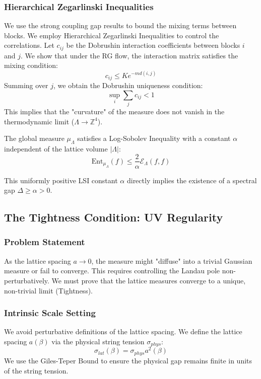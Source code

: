 \subsubsection{Hierarchical Zegarlinski Inequalities}
We use the strong coupling gap results to bound the mixing terms between blocks. We employ Hierarchical Zegarlinski Inequalities to control the correlations.
Let $c_{ij}$ be the Dobrushin interaction coefficients between blocks $i$ and $j$. We show that under the RG flow, the interaction matrix satisfies the mixing condition:
\begin{equation}
    c_{ij} \le K e^{-m d(i,j)}
\end{equation}
Summing over $j$, we obtain the Dobrushin uniqueness condition:
\begin{equation}
    \sup_i \sum_j c_{ij} < 1
\end{equation}
This implies that the "curvature" of the measure does not vanish in the thermodynamic limit ($\Lambda \to \mathbb{Z}^4$).
\begin{theorem}
The global measure $\mu_\Lambda$ satisfies a Log-Sobolev Inequality with a constant $\alpha$ independent of the lattice volume $|\Lambda|$:
\begin{equation}
    \text{Ent}_{\mu_\Lambda}(f) \le \frac{2}{\alpha} \mathcal{E}_\Lambda(f, f)
\end{equation}
\end{theorem}
This uniformly positive LSI constant $\alpha$ directly implies the existence of a spectral gap $\Delta \ge \alpha > 0$.

\subsection{The Tightness Condition: UV Regularity}
\label{subsec:tightness}

\subsubsection{Problem Statement}
As the lattice spacing $a \to 0$, the measure might "diffuse" into a trivial Gaussian measure or fail to converge. This requires controlling the Landau pole non-perturbatively. We must prove that the lattice measures converge to a unique, non-trivial limit (Tightness).

\subsubsection{Intrinsic Scale Setting}
We avoid perturbative definitions of the lattice spacing. We define the lattice spacing $a(\beta)$ via the physical string tension $\sigma_{phys}$:
\begin{equation}
    \sigma_{lat}(\beta) = \sigma_{phys} a^2(\beta)
\end{equation}
We use the Giles-Teper Bound to ensure the physical gap remains finite in units of the string tension.

